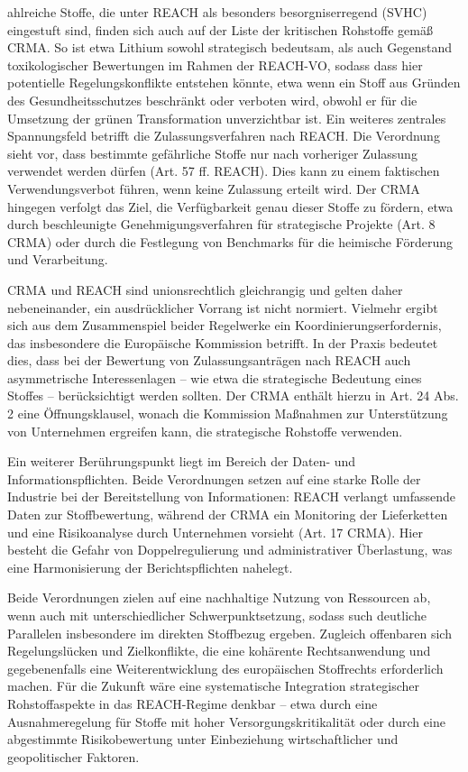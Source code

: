 \documentclass[12pt,a4paper,oneside]{book} %
\begin{document}
ahlreiche Stoffe, die unter REACH als besonders besorgniserregend (SVHC) eingestuft sind, finden sich auch auf der Liste der kritischen Rohstoffe gemäß CRMA. So ist etwa Lithium sowohl  strategisch bedeutsam, als auch Gegenstand toxikologischer Bewertungen im Rahmen der REACH-VO, sodass dass hier potentielle Regelungskonflikte entstehen könnte, etwa wenn ein Stoff aus Gründen des Gesundheitsschutzes beschränkt oder verboten wird, obwohl er für die Umsetzung der grünen Transformation unverzichtbar ist. Ein weiteres zentrales Spannungsfeld betrifft die Zulassungsverfahren nach REACH. Die Verordnung sieht vor, dass bestimmte gefährliche Stoffe nur nach vorheriger Zulassung verwendet werden dürfen (Art. 57 ff. REACH). Dies kann zu einem faktischen Verwendungsverbot führen, wenn keine Zulassung erteilt wird. Der CRMA hingegen verfolgt das Ziel, die Verfügbarkeit genau dieser Stoffe zu fördern, etwa durch beschleunigte Genehmigungsverfahren für strategische Projekte (Art. 8 CRMA) oder durch die Festlegung von Benchmarks für die heimische Förderung und Verarbeitung.

CRMA und REACH sind unionsrechtlich gleichrangig und gelten daher nebeneinander, ein ausdrücklicher Vorrang ist nicht normiert. Vielmehr ergibt sich aus dem Zusammenspiel beider Regelwerke ein Koordinierungserfordernis, das insbesondere die Europäische Kommission betrifft. In der Praxis bedeutet dies, dass bei der Bewertung von Zulassungsanträgen nach REACH auch asymmetrische Interessenlagen – wie etwa die strategische Bedeutung eines Stoffes – berücksichtigt werden sollten. Der CRMA enthält hierzu in Art. 24 Abs. 2 eine Öffnungsklausel, wonach die Kommission Maßnahmen zur Unterstützung von Unternehmen ergreifen kann, die strategische Rohstoffe verwenden. 

Ein weiterer Berührungspunkt liegt im Bereich der Daten- und Informationspflichten. Beide Verordnungen setzen auf eine starke Rolle der Industrie bei der Bereitstellung von Informationen: REACH verlangt umfassende Daten zur Stoffbewertung, während der CRMA ein Monitoring der Lieferketten und eine Risikoanalyse durch Unternehmen vorsieht (Art. 17 CRMA). Hier besteht die Gefahr von Doppelregulierung und administrativer Überlastung, was eine Harmonisierung der Berichtspflichten nahelegt.

Beide Verordnungen zielen auf eine nachhaltige Nutzung von Ressourcen ab, wenn auch mit unterschiedlicher Schwerpunktsetzung, sodass such deutliche Parallelen insbesondere im direkten Stoffbezug ergeben. Zugleich offenbaren sich Regelungslücken und Zielkonflikte, die eine kohärente Rechtsanwendung und gegebenenfalls eine Weiterentwicklung des europäischen Stoffrechts erforderlich machen. Für die Zukunft wäre eine systematische Integration strategischer Rohstoffaspekte in das REACH-Regime denkbar – etwa durch eine Ausnahmeregelung für Stoffe mit hoher Versorgungskritikalität oder durch eine abgestimmte Risikobewertung unter Einbeziehung wirtschaftlicher und geopolitischer Faktoren.
\end{document}
